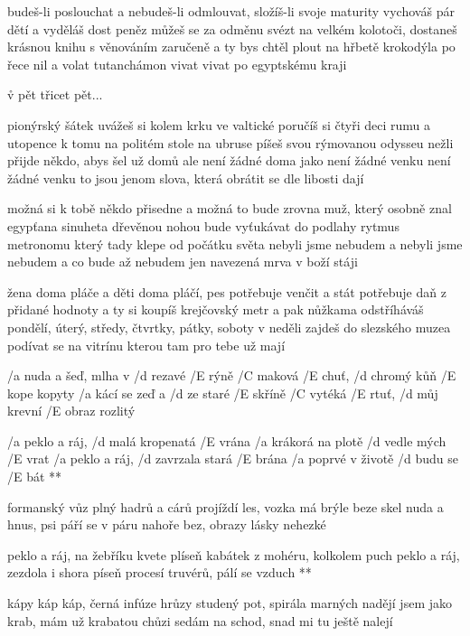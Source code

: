 budeš-li poslouchat a nebudeš-li
odmlouvat, složíš-li svoje maturity
vychováš pár dětí a vyděláš dost peněz
můžeš se za odměnu svézt na velkém
kolotoči, dostaneš krásnou knihu
s věnováním zaručeně
a ty bys chtěl plout na hřbetě krokodýla
po řece nil a volat tutanchámon
vivat vivat po egyptskému kraji

\r v pět třicet pět...

pionýrský šátek uvážeš si
kolem krku ve valtické poručíš si
čtyři deci rumu a utopence k tomu
na politém stole na ubruse
píšeš svou rýmovanou odysseu
nežli přijde někdo, abys šel už domů \songgg
ale není žádné doma jako není žádné
venku není žádné venku to jsou jenom
slova, která obrátit se dle libosti dají

\rr

možná si k tobě někdo přisedne a
možná to bude zrovna muž, který
osobně znal egypťana sinuheta
dřevěnou nohou bude vyťukávat
do podlahy rytmus metronomu
který tady klepe od počátku světa
nebyli jsme nebudem a nebyli jsme
nebudem a co bude až nebudem jen
navezená mrva v boží stáji

\rr

žena doma pláče a děti doma
pláčí, pes potřebuje venčit a
stát potřebuje daň z přidané hodnoty
a ty si koupíš krejčovský
metr a pak nůžkama
odstříháváš pondělí, úterý, středy, čtvrtky, pátky, soboty
v neděli zajdeš do slezského
muzea podívat se na vitrínu
kterou tam pro tebe už mají

\rr




/a nuda a šeď, mlha v /d rezavé /E rýně
/C maková /E chuť, /d chromý kůň /E kope kopyty
/a kácí se zeď a /d ze staré /E skříně
/C vytéká /E rtuť, /d můj krevní /E obraz rozlitý

\R /a peklo a ráj, /d malá kropenatá /E vrána
   /a krákorá na plotě /d vedle mých /E vrat
   /a peklo a ráj, /d zavrzala stará /E brána
   /a poprvé v životě /d budu se /E bát **

formanský vůz plný hadrů a cárů
projíždí les, vozka má brýle beze skel
nuda a hnus, psi páří se v páru
nahoře bez, obrazy lásky nehezké

\R peklo a ráj, na žebříku kvete plíseň
   kabátek z mohéru, kolkolem puch
   peklo a ráj, zezdola i shora píseň
   procesí truvérů, pálí se vzduch **

kápy káp káp, černá infúze hrůzy
studený pot, spirála marných nadějí
jsem jako krab, mám už krabatou chůzi
sedám na schod, snad mi tu ještě nalejí

